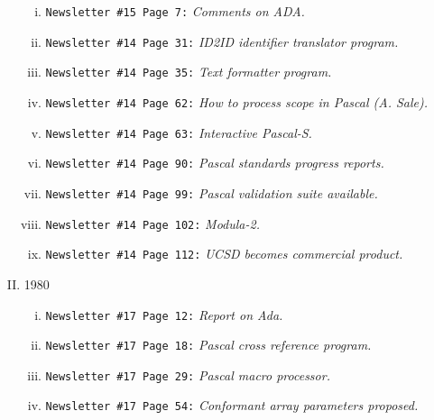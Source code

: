 \begin{enumerate}[I.]
\begin{enumerate}[i.]
\item \texttt{Newsletter \#15 Page 7:} \textit{Comments on ADA.}

\item \texttt{Newsletter \#14 Page 31:} \textit{ID2ID identifier translator program.}

\item \texttt{Newsletter \#14 Page 35:} \textit{Text formatter program.}

\item \texttt{Newsletter \#14 Page 62:} \textit{How to process scope in Pascal (A. Sale).}

\item \texttt{Newsletter \#14 Page 63:} \textit{Interactive Pascal-S.}

\item \texttt{Newsletter \#14 Page 90:} \textit{Pascal standards progress reports.}

\item \texttt{Newsletter \#14 Page 99:} \textit{Pascal validation suite available.}

\item \texttt{Newsletter \#14 Page 102:} \textit{Modula-2.}

\item \texttt{Newsletter \#14 Page 112:} \textit{UCSD becomes commercial product.}

\end{enumerate}

\item 1980

\begin{enumerate}[i.]

\item \texttt{Newsletter \#17 Page 12:} \textit{Report on Ada.}

\item \texttt{Newsletter \#17 Page 18:} \textit{Pascal cross reference program.}

\item \texttt{Newsletter \#17 Page 29:} \textit{Pascal macro processor.}

\item \texttt{Newsletter \#17 Page 54:} \textit{Conformant array parameters proposed.}

\end{enumerate}

\end{enumerate}

